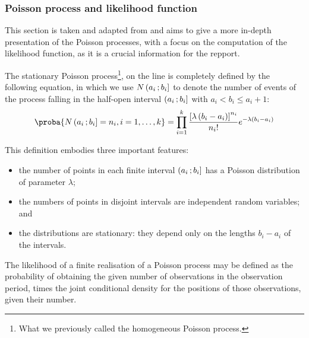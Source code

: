 \subsubsection{Poisson process and likelihood function}

This section is taken and adapted from \citep[chap.~2, p.~19-23]{daley2003introduction} and aims to give a more in-depth presentation of the Poisson processes, with a focus on the computation of the likelihood function, as it is a crucial information for the repport.

The stationary Poisson process\footnote{What we previously called the homogeneous Poisson process.}, on the line is completely defined by the following equation, in which we use $N\left( a_i \, ; b_i \right]$ to denote the number of events of the process falling in the half-open interval $\left( a_i \, ; b_i \right]$ with $a_i < b_i \leq a_i+1$:
\begin{equation}\label{eq:def_stationary_pp}
    \proba{N\intervalleOF{a_i}{b_i} = n_i, i=1,\dots,k} = \prod_{i=1}^k \frac{\bracks{\lambda\pars{b_i-a_i}}^{n_i}}{n_i!}e^{-\lambda\pars{b_i-a_i}}
\end{equation}

This definition embodies three important features:
\begin{itemize}
    \item the number of points in each finite interval $\left( a_i \, ; b_i \right]$ has a Poisson distribution of parameter $\lambda$;
    
    \item the numbers of points in disjoint intervals are independent random variables; and
    
    \item the distributions are stationary: they depend only on the lengths $b_i - a_i$ of the intervals.
\end{itemize}

The likelihood of a finite realisation of a Poisson process may be defined as the probability of obtaining the given number of observations in the observation period, times the joint conditional density for the positions of those observations, given their number.

